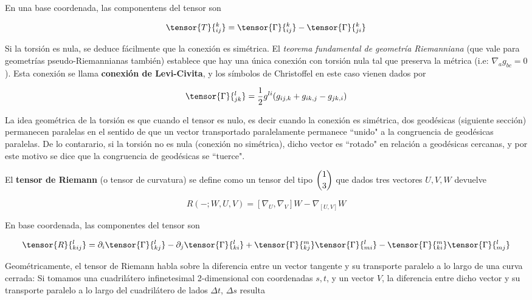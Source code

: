 En una base coordenada, las componentens del tensor son

\begin{equation*}
    \tensor{T}{^k_{ij}}=\tensor{\Gamma}{^k_{ij}}-\tensor{\Gamma}{^k_{ji}}
\end{equation*}

Si la torsión es nula, se deduce fácilmente que la conexión es simétrica. El \textit{teorema fundamental de geometría Riemanniana} (que vale para geometrías pseudo-Riemannianas también) establece que hay una única conexión con torsión nula tal que preserva la métrica (i.e: $\nabla_ag_{bc}=0$). Esta conexión se llama \textbf{conexión de Levi-Civita}, y los símbolos de Christoffel en este caso vienen dados por

\begin{equation*}
    \tensor{\Gamma}{^l_{jk}}=\frac{1}{2}g^{li}(g_{ij,k}+g_{ik,j}-g_{jk,i})
\end{equation*}

La idea geométrica de la torsión es que cuando el tensor es nulo, es decir cuando la conexión es simétrica, dos geodésicas (siguiente sección) permanecen paralelas en el sentido de que un vector transportado paralelamente permanece ``unido" a la congruencia de geodésicas paralelas. De lo contarario, si la torsión no es nula (conexión no simétrica), dicho vector es ``rotado" en relación a geodésicas cercanas, y por este motivo se dice que la congruencia de geodésicas se ``tuerce".

El \textbf{tensor de Riemann} (o tensor de curvatura) se define como un tensor del tipo $\dbinom{1}{3}$ que dados tres vectores $U,V,W$ devuelve

\begin{equation}\label{definicion Riemann}
    R(-;W,U,V)=[\nabla_U,\nabla_V]W-\nabla_{[U,V]}W
\end{equation}

En base coordenada, las componentes del tensor son

\begin{equation*}
    \tensor{R}{^l_{kij}}=\partial_i\tensor{\Gamma}{^l_{kj}}-\partial_j\tensor{\Gamma}{^l_{ki}}+\tensor{\Gamma}{^m_{kj}}\tensor{\Gamma}{^l_{mi}}-\tensor{\Gamma}{^m_{ki}}\tensor{\Gamma}{^l_{mj}}
\end{equation*}

Geométricamente, el tensor de Riemann habla sobre la diferencia entre un vector tangente y su transporte paralelo a lo largo de una curva cerrada: Si tomamos una cuadrilátero infinetesimal 2-dimensional con coordenadas $s,t$, y un vector $V$, la diferencia entre dicho vector y su transporte paralelo a lo largo del cuadrilátero de lados $\Delta t$, $\Delta s$ resulta

